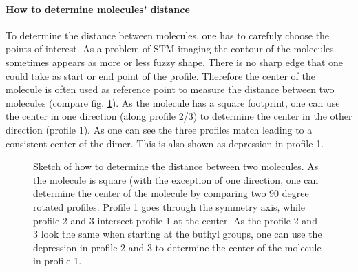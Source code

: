 \paragraph{How to determine molecules' distance}
To determine the distance between molecules, one has to carefuly choose the points of interest. As a problem of STM imaging the contour of the molecules sometimes appears as more or less fuzzy shape. There is no sharp edge that one could take as start or end point of the profile. Therefore the center of the molecule is often used as reference point to measure the distance between two molecules (compare fig. \ref{fig:distance-molecules}). As the molecule has a square footprint, one can use the center in one direction (along profile 2/3) to determine the center in the other direction (profile 1). As one can see the three profiles match leading to a consistent center of the dimer. This is also shown as depression in profile 1. 

\begin{figure}[!ht]
\centering
{}
\caption{Sketch of how to determine the distance between two molecules. As the molecule is square (with the exception of one direction, one can determine the center of the molecule by comparing two 90 degree rotated profiles. Profile 1 goes through the symmetry axis, while profile 2 and 3 intersect profile 1 at the center. As the profile 2 and 3 look the same when starting at the buthyl groups, one can use the depression in profile 2 and 3 to determine the center of the molecule in profile 1.}
\label{fig:distance-molecules}
\end{figure}